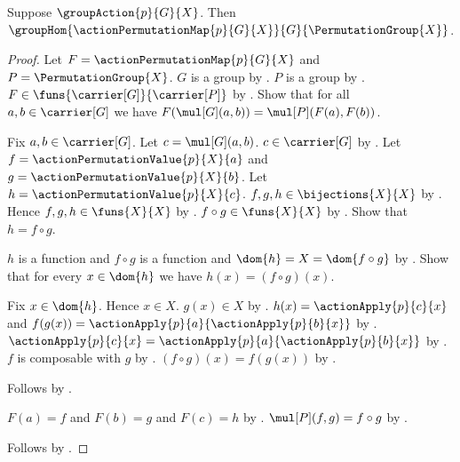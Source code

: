 \begin{theorem}\label{action_permutation_map_group_hom}
    Suppose $\groupAction{p}{G}{X}$.
    Then
        $\groupHom
            {\actionPermutationMap{p}{G}{X}}
            {G}{\PermutationGroup{X}}$.
\end{theorem}
\begin{proof}
    Let $F=\actionPermutationMap{p}{G}{X}$ and
        $P=\PermutationGroup{X}$.
    $G$ is a group by .
    $P$ is a group by .
    $F\in\funs{\carrier[G]}{\carrier[P]}$ by
        .
    Show that for all $a,b\in\carrier[G]$ we have
        $F(\mul[G](a,b))=\mul[P](F(a),F(b))$.
    \begin{subproof}
        Fix $a,b\in\carrier[G]$.
        Let $c=\mul[G](a,b)$.
        $c\in\carrier[G]$ by
            .
        Let $f=\actionPermutationValue{p}{X}{a}$ and
            $g=\actionPermutationValue{p}{X}{b}$.
        Let $h=\actionPermutationValue{p}{X}{c}$.
        $f,g,h\in\bijections{X}{X}$ by
            .
        Hence $f,g,h\in\funs{X}{X}$ by
            .
        $f\circ g\in\funs{X}{X}$ by .
        Show that $h=f\circ g$.
        \begin{subproof}
            $h$ is a function and $f\circ g$ is a function and
                $\dom{h}=X=\dom{f\circ g}$ by
                .
            Show that for every $x\in\dom{h}$ we have
                $h(x)=(f\circ g)(x)$.
            \begin{subproof}
                Fix $x\in\dom{h}$.
                Hence $x\in X$.
                $g(x)\in X$ by .
                $h(x)=\actionApply{p}{c}{x}$ and
                    $f(g(x))=
                        \actionApply{p}{a}{\actionApply{p}{b}{x}}$ by
                    .
                $\actionApply{p}{c}{x}=
                    \actionApply{p}{a}{\actionApply{p}{b}{x}}$ by
                    .
                $f$ is composable with $g$ by
                    .
                $(f\circ g)(x)=f(g(x))$ by
                    .
            \end{subproof}
            Follows by .
        \end{subproof}
        $F(a)=f$ and $F(b)=g$ and $F(c)=h$ by
            .
        $\mul[P](f,g)=f\circ g$ by
            .
    \end{subproof}
    Follows by .
\end{proof}

